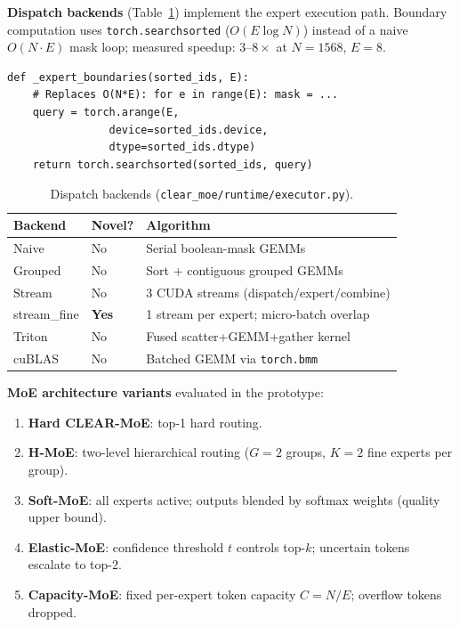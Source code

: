 \documentclass[conference]{IEEEtran}
\begin{document}
\textbf{Dispatch backends} (Table~\ref{tab:dispatch_algo}) implement the
expert execution path. Boundary computation uses
\texttt{torch.searchsorted} ($O(E\log N)$) instead of a naive
$O(N{\cdot}E)$ mask loop; measured speedup: $3$--$8\times$ at
$N{=}1568$, $E{=}8$.

\begin{lstlisting}[caption={$O(E\log N)$ expert boundary detection.},
label={lst:searchsorted}]
def _expert_boundaries(sorted_ids, E):
    # Replaces O(N*E): for e in range(E): mask = ...
    query = torch.arange(E,
                device=sorted_ids.device,
                dtype=sorted_ids.dtype)
    return torch.searchsorted(sorted_ids, query)
\end{lstlisting}

\begin{table}[htbp]
\caption{Dispatch backends (\texttt{clear\_moe/runtime/executor.py}).}
\label{tab:dispatch_algo}
\centering
\scriptsize
\begin{tabular}{llp{2.0cm}}
\toprule
\textbf{Backend} & \textbf{Novel?} & \textbf{Algorithm} \\
\midrule
Naive          & No  & Serial boolean-mask GEMMs \\
Grouped        & No  & Sort + contiguous grouped GEMMs \\
Stream         & No  & 3 CUDA streams (dispatch/expert/combine) \\
stream\_fine   & \textbf{Yes} & 1 stream per expert; micro-batch overlap \\
Triton         & No  & Fused scatter+GEMM+gather kernel \\
cuBLAS         & No  & Batched GEMM via \texttt{torch.bmm} \\
\bottomrule
\end{tabular}
\end{table}

\textbf{MoE architecture variants} evaluated in the prototype:
\begin{enumerate}[leftmargin=*,noitemsep]
\item \textbf{Hard CLEAR-MoE}: top-1 hard routing.
\item \textbf{H-MoE}: two-level hierarchical routing
  ($G{=}2$ groups, $K{=}2$ fine experts per group).
\item \textbf{Soft-MoE}: all experts active; outputs blended by softmax
  weights (quality upper bound).
\item \textbf{Elastic-MoE}: confidence threshold $t$ controls top-$k$;
  uncertain tokens escalate to top-2.
\item \textbf{Capacity-MoE}: fixed per-expert token capacity $C{=}N/E$;
  overflow tokens dropped.
\end{enumerate}
\end{document}
